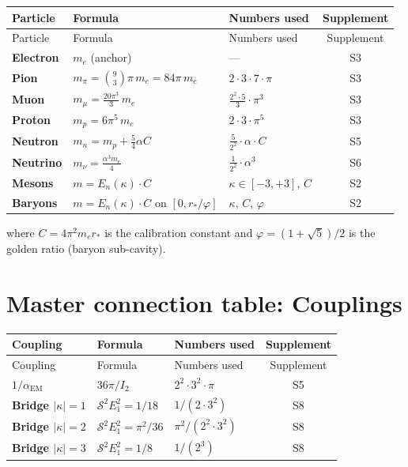 \documentclass[11pt,letterpaper]{article}
\numberwithin{equation}{section}
\begin{document}
\begin{longtable}{p{2.5cm}p{5cm}p{3.5cm}c}
\toprule
Particle & Formula & Numbers used & Supplement \\
\midrule
\endfirsthead
\toprule
Particle & Formula & Numbers used & Supplement \\
\midrule
\endhead
\textbf{Electron} & $m_e$ (anchor) & --- & S3 \\
\textbf{Pion} & $m_\pi = \binom{9}{3}\pi\,m_e = 84\pi\,m_e$ & $2 \cdot 3 \cdot 7 \cdot \pi$ & S3 \\
\textbf{Muon} & $m_\mu = \frac{20\pi^3}{3}\,m_e$ & $\frac{2^2 \cdot 5}{3}\cdot\pi^3$ & S3 \\
\textbf{Proton} & $m_p = 6\pi^5\,m_e$ & $2 \cdot 3 \cdot \pi^5$ & S3 \\
\textbf{Neutron} & $m_n = m_p + \frac{5}{4}\alpha C$ & $\frac{5}{2^2} \cdot \alpha \cdot C$ & S5 \\
\textbf{Neutrino} & $m_\nu = \frac{\alpha^3 m_e}{4}$ & $\frac{1}{2^2}\cdot\alpha^3$ & S6 \\
\textbf{Mesons} & $m = E_n(\kappa) \cdot C$ & $\kappa \in [-3,+3]$, $C$ & S2 \\
\textbf{Baryons} & $m = E_n(\kappa) \cdot C$ on $[0, r_*/\varphi]$ & $\kappa$, $C$, $\varphi$ & S2 \\
\bottomrule
\end{longtable}

where $C = 4\pi^2 m_e r_*$ is the calibration constant and
$\varphi = (1+\sqrt{5})/2$ is the golden ratio (baryon sub-cavity).

\section{Master connection table: Couplings}
\label{sec:couplings}

\begin{longtable}{p{3cm}p{5cm}p{3cm}c}
\toprule
Coupling & Formula & Numbers used & Supplement \\
\midrule
\endfirsthead
\toprule
Coupling & Formula & Numbers used & Supplement \\
\midrule
\endhead
\textbf{$1/\alpha_\mathrm{EM}$} & $36\pi/I_2$ & $2^2 \cdot 3^2 \cdot \pi$ & S5 \\
\textbf{Bridge $|\kappa|=1$} & $\mathcal{S}^2 E_1^2 = 1/18$ & $1/(2\cdot 3^2)$ & S8 \\
\textbf{Bridge $|\kappa|=2$} & $\mathcal{S}^2 E_1^2 = \pi^2/36$ & $\pi^2/(2^2\cdot 3^2)$ & S8 \\
\textbf{Bridge $|\kappa|=3$} & $\mathcal{S}^2 E_1^2 = 1/8$ & $1/(2^3)$ & S8 \\
\bottomrule
\end{longtable}
\end{document}
